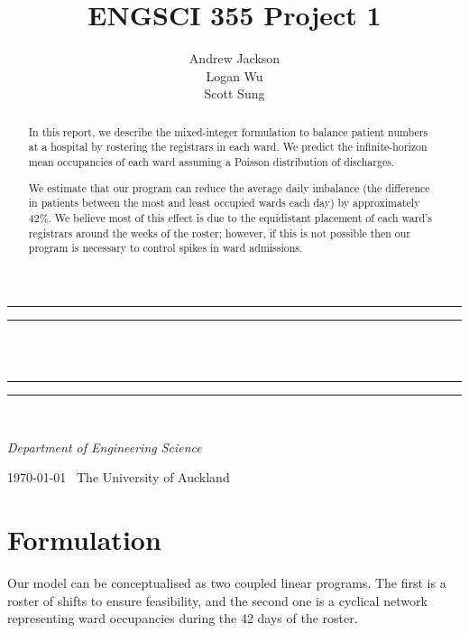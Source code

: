 \documentclass[a4paper]{article}
\title{ENGSCI 355 Project 1}
\author{Andrew Jackson\\Logan Wu\\Scott Sung}
\newlength{\drop}
\begin{document}
\begin{titlepage}
    \textheight
    \centering
    \vspace*{\baselineskip}
    \rule{\textwidth}{1.6pt}\vspace*{-\baselineskip}\vspace*{2pt}
    \rule{\textwidth}{0.4pt}\\[\baselineskip]
    {\LARGE \@title}\\[0.2\baselineskip]
    \rule{\textwidth}{0.4pt}\vspace*{-\baselineskip}\vspace{3.2pt}
    \rule{\textwidth}{1.6pt}\\[\baselineskip]
    \vspace*{2\baselineskip}
    {\Large \textsc{\@author}\par}
    {\itshape Department of Engineering Science\par}
    \vspace*{2\baselineskip}
    {\scshape \today} \        {\large The University of Auckland}\par
    \vspace{\fill}
    \begin{abstract}
    In this report, we describe the mixed-integer formulation to balance patient numbers at a hospital by rostering the registrars in each ward. We predict the infinite-horizon mean occupancies of each ward assuming a Poisson distribution of discharges.
    
We estimate that our program can reduce the average daily imbalance (the difference in patients between the most and least occupied wards each day) by approximately 42\%. We believe most of this effect is due to the equidistant placement of each ward's registrars around the weeks of the roster; however, if this is not possible then our program is necessary to control spikes in ward admissions.
    \end{abstract}
    \vspace{\fill}
\end{titlepage}
\makeatother
\pagestyle{fancy}

\section{Formulation}

Our model can be conceptualised as two coupled linear programs. The first is a roster of shifts to ensure feasibility, and the second one is a cyclical network representing ward occupancies during the 42 days of the roster.
\end{document}
